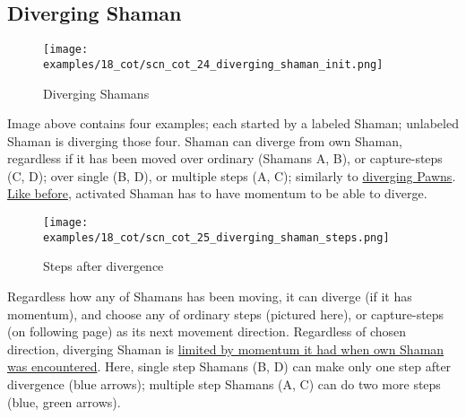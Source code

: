 \clearpage %

\subsection*{Diverging Shaman}
\label{sec:Conquest of Tlalocan/Shaman/Movement/Diverging Shaman}

\vspace*{-1.4\baselineskip}
\noindent
\begin{figure}[!h]
\texttt{[image: examples/18\_cot/scn\_cot\_24\_diverging\_shaman\_init.png]}
\vspace*{-1.3\baselineskip}
\caption{Diverging Shamans}
\label{fig:scn_cot_24_diverging_shaman_init}
\end{figure}

\vspace*{-0.5\baselineskip}
Image above contains four examples; each started by a labeled Shaman; unlabeled
Shaman is diverging those four. \newline %
\indent
Shaman can diverge from own Shaman, regardless if it has been moved over ordinary
(Shamans A, B), or capture-steps (C, D); over single (B, D), or multiple steps (A, C);
similarly to \hyperref[fig:scn_cot_13_diverging_pawn_init]{diverging Pawns}.
\hyperref[fig:scn_cot_11_diverging_activated_piece_init]{Like before}, activated
Shaman has to have momentum to be able to diverge.

\clearpage %

\vspace*{-2.1\baselineskip}
\noindent
\begin{figure}[!h]
\texttt{[image: examples/18\_cot/scn\_cot\_25\_diverging\_shaman\_steps.png]}
\vspace*{-1.3\baselineskip}
\caption{Steps after divergence}
\label{fig:scn_cot_25_diverging_shaman_steps}
\end{figure}

\vspace*{-0.5\baselineskip}
Regardless how any of Shamans has been moving, it can diverge (if it has momentum),
and choose any of ordinary steps (pictured here), or capture-steps (on following page)
as its next movement direction. Regardless of chosen direction, diverging Shaman is
\hyperref[fig:scn_cot_10_own_shaman_is_divergent_end]{limited by momentum it had when own Shaman was encountered}. \newline
\indent
Here, single step Shamans (B, D) can make only one step after divergence (blue arrows);
multiple step Shamans (A, C) can do two more steps (blue, green arrows).

